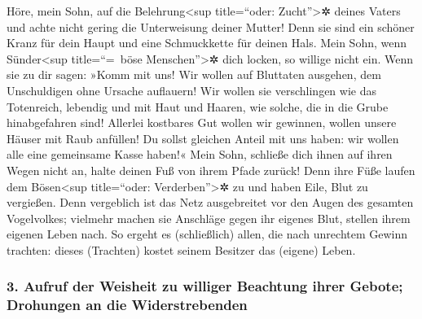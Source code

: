 Höre, mein Sohn, auf die Belehrung\textless sup
title=``oder: Zucht''\textgreater✲ deines Vaters und achte nicht gering
die Unterweisung deiner Mutter! Denn sie sind ein schöner
Kranz für dein Haupt und eine Schmuckkette für deinen Hals.
Mein Sohn, wenn Sünder\textless sup title=``=~böse
Menschen''\textgreater✲ dich locken, so willige nicht ein.
Wenn sie zu dir sagen: »Komm mit uns! Wir wollen auf
Bluttaten ausgehen, dem Unschuldigen ohne Ursache auflauern!
Wir wollen sie verschlingen wie das Totenreich, lebendig
und mit Haut und Haaren, wie solche, die in die Grube hinabgefahren
sind! Allerlei kostbares Gut wollen wir gewinnen, wollen
unsere Häuser mit Raub anfüllen! Du sollst gleichen
Anteil mit uns haben: wir wollen alle eine gemeinsame Kasse haben!«
Mein Sohn, schließe dich ihnen auf ihren Wegen nicht an,
halte deinen Fuß von ihrem Pfade zurück! Denn ihre Füße
laufen dem Bösen\textless sup title=``oder: Verderben''\textgreater✲ zu
und haben Eile, Blut zu vergießen. Denn vergeblich ist
das Netz ausgebreitet vor den Augen des gesamten Vogelvolkes;
vielmehr machen sie Anschläge gegen ihr eigenes Blut,
stellen ihrem eigenen Leben nach. So ergeht es
(schließlich) allen, die nach unrechtem Gewinn trachten: dieses
(Trachten) kostet seinem Besitzer das (eigene) Leben.

\hypertarget{aufruf-der-weisheit-zu-williger-beachtung-ihrer-gebote-drohungen-an-die-widerstrebenden}{%
\subsubsection{3. Aufruf der Weisheit zu williger Beachtung ihrer
Gebote; Drohungen an die
Widerstrebenden}\label{aufruf-der-weisheit-zu-williger-beachtung-ihrer-gebote-drohungen-an-die-widerstrebenden}}

